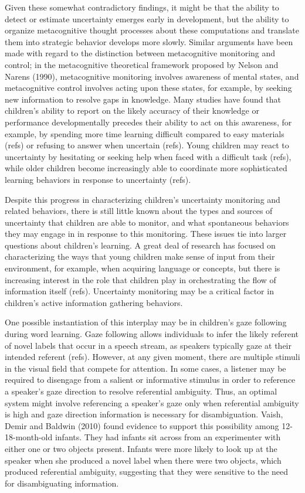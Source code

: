 \documentclass[10pt, letterpaper]{article}
\begin{document}
Given these somewhat contradictory findings, it might be that the
ability to detect or estimate uncertainty emerges early in development,
but the ability to organize metacognitive thought processes about these
computations and translate them into strategic behavior develops more
slowly. Similar arguments have been made with regard to the distinction
between metacognitive monitoring and control; in the metacognitive
theoretical framework proposed by Nelson and Narens (1990),
metacognitive monitoring involves awareness of mental states, and
metacognitive control involves acting upon these states, for example, by
seeking new information to resolve gaps in knowledge. Many studies have
found that children's ability to report on the likely accuracy of their
knowledge or performance developmentally precedes their ability to act
on this awareness, for example, by spending more time learning difficult
compared to easy materials (refs) or refusing to answer when uncertain
(refs). Young children may react to uncertainty by hesitating or seeking
help when faced with a difficult task (refs), while older children
become increasingly able to coordinate more sophisticated learning
behaviors in response to uncertainty (refs).

Despite this progress in characterizing children's uncertainty
monitoring and related behaviors, there is still little known about the
types and sources of uncertainty that children are able to monitor, and
what spontaneous behaviors they may engage in in response to this
monitoring. These issues tie into larger questions about children's
learning. A great deal of research has focused on characterizing the
ways that young children make sense of input from their environment, for
example, when acquiring language or concepts, but there is increasing
interest in the role that children play in orchestrating the flow of
information itself (refs). Uncertainty monitoring may be a critical
factor in children's active information gathering behaviors.

One possible instantiation of this interplay may be in children's gaze
following during word learning. Gaze following allows individuals to
infer the likely referent of novel labels that occur in a speech stream,
as speakers typically gaze at their intended referent (refs). However,
at any given moment, there are multiple stimuli in the visual field that
compete for attention. In some cases, a listener may be required to
disengage from a salient or informative stimulus in order to reference a
speaker's gaze direction to resolve referential ambiguity. Thus, an
optimal system might involve referencing a speaker's gaze only when
referential ambiguity is high and gaze direction information is
necessary for disambiguation. Vaish, Demir and Baldwin (2010) found
evidence to support this possibility among 12-18-month-old infants. They
had infants sit across from an experimenter with either one or two
objects present. Infants were more likely to look up at the speaker when
she produced a novel label when there were two objects, which produced
referential ambiguity, suggesting that they were sensitive to the need
for disambiguating information.
\end{document}
